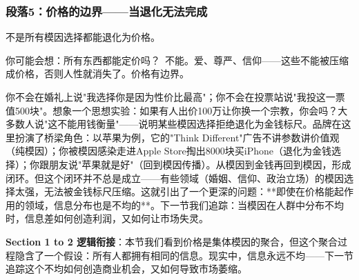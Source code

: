 \documentclass[a4paper,12pt]{book}
\begin{document}
	\subsubsection*{段落5：价格的边界——当退化无法完成}
	不是所有模因选择都能退化为价格。
	\begin{tcolorbox}[colback=yellow!5, title=\textit{读者行为预测}]
		你可能会想：所有东西都能定价吗？\ 不能。爱、尊严、信仰——这些不能被压缩成价格，否则人性就消失了。价格有边界。
	\end{tcolorbox}

你不会在婚礼上说"我选择你是因为性价比最高"；你不会在投票站说"我投这一票值500块"。想象一个思想实验：如果有人出价100万让你换一个宗教，你会吗？大多数人说"这不能用钱衡量"——说明某些模因选择拒绝退化为金钱标尺。品牌在这里扮演了桥梁角色：以苹果为例，它的"Think Different"广告不讲参数讲价值观（纯模因）；你被模因感染走进Apple Store掏出8000块买iPhone（退化为金钱选择）；你跟朋友说"苹果就是好"（回到模因传播）。从模因到金钱再回到模因，形成闭环。但这个闭环并不总是成立——有些领域（婚姻、信仰、政治立场）的模因选择太强，无法被金钱标尺压缩。这就引出了一个更深的问题：**即使在价格能起作用的领域，信息分布也是不均的**。下一节我们追踪：当模因在人群中分布不均时，信息差如何创造利润，又如何让市场失灵。

	\textbf{Section 1 to 2 逻辑衔接}：本节我们看到价格是集体模因的聚合，但这个聚合过程隐含了一个假设：所有人都拥有相同的信息。现实中，信息永远不均——下一节追踪这个不均如何创造商业机会，又如何导致市场萎缩。

	
\end{document}
